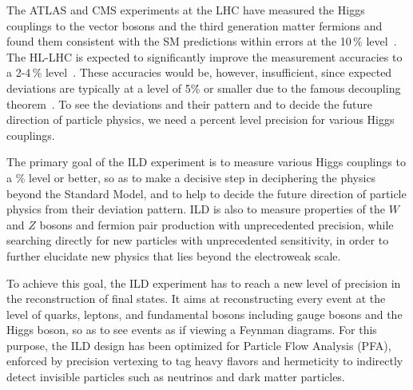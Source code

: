 The ATLAS and CMS experiments at the LHC have measured the Higgs couplings to the vector bosons and the third generation matter fermions and found them consistent with the SM predictions within errors at the 10\,\% level~\cite{Cepeda:2019klc}. The HL-LHC is expected to significantly improve the measurement accuracies to a 2-4\,\% level~\cite{Ref:HL-LHC}. These accuracies would be, however, insufficient, since expected deviations are typically at a level of 5\.\% or smaller due to the famous decoupling theorem~\cite{Ref:Decoupling}. To see the deviations and their pattern and to decide the future direction of particle physics, we need a percent level precision for various Higgs couplings.

The primary goal of the ILD experiment is to measure various Higgs couplings to a \% level or better, so as to make a decisive step in deciphering the physics beyond the Standard Model, and to help to 
decide the future direction of particle physics from their deviation pattern. ILD is also to measure properties of the $W$ and $Z$ bosons and fermion pair production with unprecedented precision, while searching directly for new particles with unprecedented sensitivity, in order to further elucidate new physics that lies beyond the electroweak scale.

To achieve this goal, the ILD experiment has to reach a new level of precision in the reconstruction of final states. It aims at reconstructing every event at the level of quarks, leptons, and fundamental bosons including gauge bosons and the Higgs boson, so as to see events as if viewing a Feynman diagrams. For this purpose, the ILD design has been optimized for Particle Flow Analysis (PFA), enforced by precision vertexing to tag heavy flavors and hermeticity to indirectly detect invisible particles such as neutrinos and dark matter particles. 

